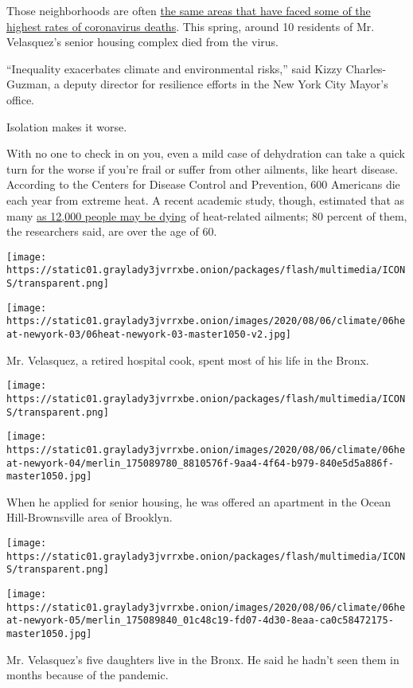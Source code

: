 Those neighborhoods are often
\href{http://a816-dohbesp.nyc.gov/IndicatorPublic/HeatHub/hvi.html}{the
same areas that have faced some of the highest rates of coronavirus
deaths}. This spring, around 10 residents of Mr. Velasquez's senior
housing complex died from the virus.

``Inequality exacerbates climate and environmental risks,'' said Kizzy
Charles-Guzman, a deputy director for resilience efforts in the New York
City Mayor's office.

Isolation makes it worse.

With no one to check in on you, even a mild case of dehydration can take
a quick turn for the worse if you're frail or suffer from other
ailments, like heart disease. According to the Centers for Disease
Control and Prevention, 600 Americans die each year from extreme heat. A
recent academic study, though, estimated that as many
\href{https://www.climatecentral.org/news/2020-Heat-and-Seniors}{as
12,000 people may be dying} of heat-related ailments; 80 percent of
them, the researchers said, are over the age of 60.

\texttt{[image: https://static01.graylady3jvrrxbe.onion/packages/flash/multimedia/ICONS/transparent.png]}

\texttt{[image: https://static01.graylady3jvrrxbe.onion/images/2020/08/06/climate/06heat-newyork-03/06heat-newyork-03-master1050-v2.jpg]}

Mr. Velasquez, a retired hospital cook, spent most of his life in the
Bronx.

\texttt{[image: https://static01.graylady3jvrrxbe.onion/packages/flash/multimedia/ICONS/transparent.png]}

\texttt{[image: https://static01.graylady3jvrrxbe.onion/images/2020/08/06/climate/06heat-newyork-04/merlin\_175089780\_8810576f-9aa4-4f64-b979-840e5d5a886f-master1050.jpg]}

When he applied for senior housing, he was offered an apartment in the
Ocean Hill-Brownsville area of Brooklyn.

\texttt{[image: https://static01.graylady3jvrrxbe.onion/packages/flash/multimedia/ICONS/transparent.png]}

\texttt{[image: https://static01.graylady3jvrrxbe.onion/images/2020/08/06/climate/06heat-newyork-05/merlin\_175089840\_01c48c19-fd07-4d30-8eaa-ca0c58472175-master1050.jpg]}

Mr. Velasquez's five daughters live in the Bronx. He said he hadn't seen
them in months because of the pandemic.

